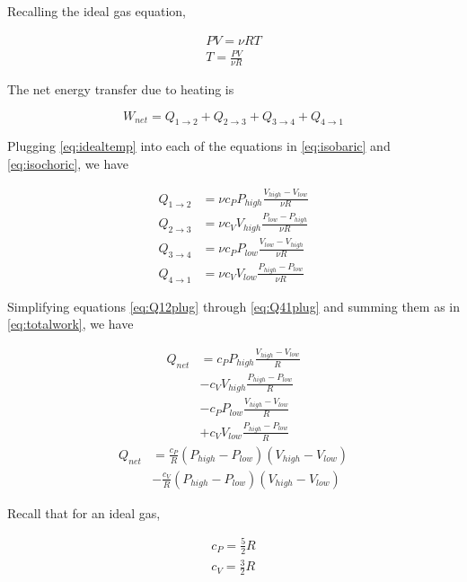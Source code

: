 \documentclass[9pt,a4paper,twocolumn]{article}
\begin{document}
Recalling the ideal gas equation,

\begin{eqnarray}
	PV = \nu RT \label{eq:idealgas} \\
	T = \frac{PV}{\nu R} \label{eq:idealtemp}
\end{eqnarray}

The net energy transfer due to heating is

\begin{equation}\label{eq:totalwork}
	W_{net} = Q_{1 \rightarrow 2} + Q_{2 \rightarrow 3} + Q_{3 \rightarrow 4} + Q_{4 \rightarrow 1}
\end{equation}

Plugging \eqref{eq:idealtemp} into each of the equations in \eqref{eq:isobaric} and \eqref{eq:isochoric}, we have

\begin{align}
	Q_{1 \rightarrow 2} & = \nu c_P P_{high} \frac{V_{high} - V_{low}}{\nu R} \label{eq:Q12plug} \\
	Q_{2 \rightarrow 3} & = \nu c_V V_{high} \frac{P_{low} - P_{high}}{\nu R} \label{eq:Q23plug} \\
	Q_{3 \rightarrow 4} & = \nu c_P P_{low} \frac{V_{low} - V_{high}}{\nu R} \label{eq:Q34plug} \\
	Q_{4 \rightarrow 1} & = \nu c_V V_{low} \frac{P_{high} - P_{low}}{\nu R} \label{eq:Q41plug}
\end{align}

Simplifying equations \eqref{eq:Q12plug} through \eqref{eq:Q41plug} and summing them as in \eqref{eq:totalwork}, we have

\begin{align}
	Q_{net} & = c_P P_{high} \frac{V_{high} - V_{low}}{R} \nonumber \\
	& - c_V V_{high} \frac{P_{high} - P_{low}}{R} \nonumber \\
	& - c_P P_{low} \frac{V_{high} - V_{low}}{R} \nonumber \\
	& + c_V V_{low} \frac{P_{high} - P_{low}}{R}
\end{align}
\begin{align}
	Q_{net} & = \frac{c_P}{R} \left( P_{high} - P_{low} \right) \left( V_{high} - V_{low} \right) \nonumber \\
	& -\frac{c_V}{R} \left( P_{high} - P_{low} \right) \left( V_{high} - V_{low} \right) \label{eq:Wnetplug}
\end{align}

Recall that for an ideal gas,

\begin{eqnarray}
	c_P = \frac{5}{2} R \label{eq:idealcp} \\
	c_V = \frac{3}{2} R \label{eq:idealcv}
\end{eqnarray}
\end{document}
